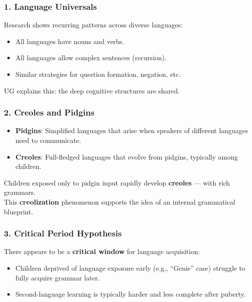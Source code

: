\documentclass[12pt]{article}
\newcommand{\tightlist}{\itemsep 0pt\parskip 0pt\parsep 0pt}
\begin{document}
\hypertarget{language-universals}{%
\subsubsection{1. Language Universals}\label{language-universals}}

Research shows recurring patterns across diverse languages:

\begin{itemize}
\tightlist
\item
  All languages have nouns and verbs.
\item
  All languages allow complex sentences (recursion).
\item
  Similar strategies for question formation, negation, etc.
\end{itemize}

UG explains this: the deep cognitive structures are shared.

\hypertarget{creoles-and-pidgins}{%
\subsubsection{2. Creoles and Pidgins}\label{creoles-and-pidgins}}

\begin{itemize}
\tightlist
\item
  \textbf{Pidgins}: Simplified languages that arise when speakers of
  different languages need to communicate.
\item
  \textbf{Creoles}: Full-fledged languages that evolve from pidgins,
  typically among children.
\end{itemize}

Children exposed only to pidgin input rapidly develop \textbf{creoles}
--- with rich grammars.\\
This \textbf{creolization} phenomenon supports the idea of an internal
grammatical blueprint.

\hypertarget{critical-period-hypothesis}{%
\subsubsection{3. Critical Period
Hypothesis}\label{critical-period-hypothesis}}

There appears to be a \textbf{critical window} for language acquisition:

\begin{itemize}
\tightlist
\item
  Children deprived of language exposure early (e.g., ``Genie'' case)
  struggle to fully acquire grammar later.
\item
  Second-language learning is typically harder and less complete after
  puberty.
\end{itemize}
\end{document}
